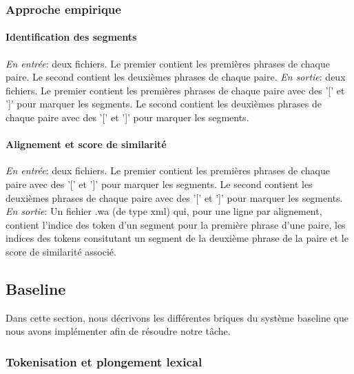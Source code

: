 \documentclass[a4paper, twoside, 11pt]{article}
\begin{document}
        \subsubsection{Approche empirique}

    \paragraph{Identification des segments}
    \hfill \break
    \textit{En entrée}: deux fichiers. Le premier contient les premières phrases de chaque paire. Le second contient les deuxièmes phrases de chaque paire. \hfill \break
    \textit{En sortie}: deux fichiers. Le premier contient les premières phrases de chaque paire avec des '[' et ']' pour marquer les segments. Le second contient les deuxièmes phrases de chaque paire avec des '[' et ']' pour marquer les segments.

 \paragraph{Alignement et score de similarité}
    \hfill \break
    \textit{En entrée}: deux fichiers. Le premier contient les premières phrases de chaque paire avec des '[' et ']' pour marquer les segments. Le second contient les deuxièmes phrases de chaque paire avec des '[' et ']' pour marquer les segments. \hfill \break
    \textit{En sortie}: Un fichier .wa (de type xml) qui, pour une ligne par alignement, contient l'indice des token d'un segment pour la première phrase d'une paire, les indices des tokens consitutant un segment de la deuxième phrase de la paire et le score de similarité associé.

    \subsection{Baseline}

    Dans cette section, nous décrivons les différentes briques du système baseline que nous avons implémenter afin de résoudre notre tâche.

    \subsubsection{Tokenisation et plongement lexical}
\end{document}
